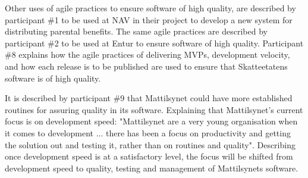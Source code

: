
Other uses of agile practices to ensure software of high quality, are described by participant \#1 to be used at NAV in their project to develop a new system for distributing parental benefits. The same agile practices are described by participant \#2 to be used at Entur to ensure software of high quality. Participant \#8 explains how the agile practices of delivering MVPs, development velocity, and how each release is to be published are used to ensure that Skatteetatens software is of high quality.



It is described by participant \#9 that Mattilsynet could have more established routines for assuring quality in its software. Explaining that Mattilsynet's current focus is on development speed: "Mattilsynet are a very young organisation when it comes to development ... there has been a focus on productivity and getting the solution out and testing it, rather than on routines and quality". Describing once development speed is at a satisfactory level, the focus will be shifted from development speed to quality, testing and management of Mattilsynets software.

